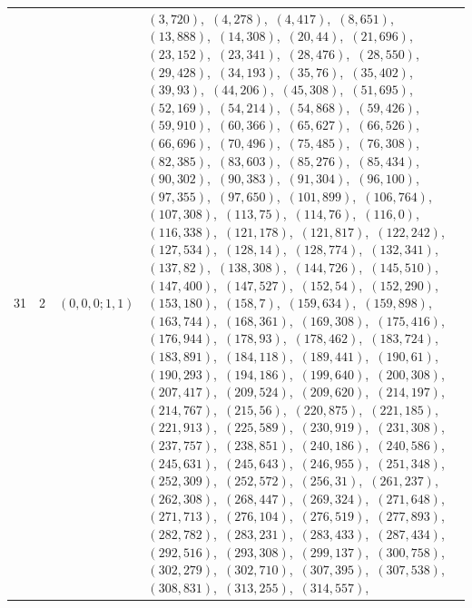 \documentclass[11pt]{article}
\begin{document}
\begin{longtable}{@{}rrl>{\raggedright\arraybackslash}p{}@{}}
31 & 2 & $(0,0,0;1,1)$ & $(3,720)$,\allowbreak\ $(4,278)$,\allowbreak\ $(4,417)$,\allowbreak\ $(8,651)$,\allowbreak\ $(13,888)$,\allowbreak\ $(14,308)$,\allowbreak\ $(20,44)$,\allowbreak\ $(21,696)$,\allowbreak\ $(23,152)$,\allowbreak\ $(23,341)$,\allowbreak\ $(28,476)$,\allowbreak\ $(28,550)$,\allowbreak\ $(29,428)$,\allowbreak\ $(34,193)$,\allowbreak\ $(35,76)$,\allowbreak\ $(35,402)$,\allowbreak\ $(39,93)$,\allowbreak\ $(44,206)$,\allowbreak\ $(45,308)$,\allowbreak\ $(51,695)$,\allowbreak\ $(52,169)$,\allowbreak\ $(54,214)$,\allowbreak\ $(54,868)$,\allowbreak\ $(59,426)$,\allowbreak\ $(59,910)$,\allowbreak\ $(60,366)$,\allowbreak\ $(65,627)$,\allowbreak\ $(66,526)$,\allowbreak\ $(66,696)$,\allowbreak\ $(70,496)$,\allowbreak\ $(75,485)$,\allowbreak\ $(76,308)$,\allowbreak\ $(82,385)$,\allowbreak\ $(83,603)$,\allowbreak\ $(85,276)$,\allowbreak\ $(85,434)$,\allowbreak\ $(90,302)$,\allowbreak\ $(90,383)$,\allowbreak\ $(91,304)$,\allowbreak\ $(96,100)$,\allowbreak\ $(97,355)$,\allowbreak\ $(97,650)$,\allowbreak\ $(101,899)$,\allowbreak\ $(106,764)$,\allowbreak\ $(107,308)$,\allowbreak\ $(113,75)$,\allowbreak\ $(114,76)$,\allowbreak\ $(116,0)$,\allowbreak\ $(116,338)$,\allowbreak\ $(121,178)$,\allowbreak\ $(121,817)$,\allowbreak\ $(122,242)$,\allowbreak\ $(127,534)$,\allowbreak\ $(128,14)$,\allowbreak\ $(128,774)$,\allowbreak\ $(132,341)$,\allowbreak\ $(137,82)$,\allowbreak\ $(138,308)$,\allowbreak\ $(144,726)$,\allowbreak\ $(145,510)$,\allowbreak\ $(147,400)$,\allowbreak\ $(147,527)$,\allowbreak\ $(152,54)$,\allowbreak\ $(152,290)$,\allowbreak\ $(153,180)$,\allowbreak\ $(158,7)$,\allowbreak\ $(159,634)$,\allowbreak\ $(159,898)$,\allowbreak\ $(163,744)$,\allowbreak\ $(168,361)$,\allowbreak\ $(169,308)$,\allowbreak\ $(175,416)$,\allowbreak\ $(176,944)$,\allowbreak\ $(178,93)$,\allowbreak\ $(178,462)$,\allowbreak\ $(183,724)$,\allowbreak\ $(183,891)$,\allowbreak\ $(184,118)$,\allowbreak\ $(189,441)$,\allowbreak\ $(190,61)$,\allowbreak\ $(190,293)$,\allowbreak\ $(194,186)$,\allowbreak\ $(199,640)$,\allowbreak\ $(200,308)$,\allowbreak\ $(207,417)$,\allowbreak\ $(209,524)$,\allowbreak\ $(209,620)$,\allowbreak\ $(214,197)$,\allowbreak\ $(214,767)$,\allowbreak\ $(215,56)$,\allowbreak\ $(220,875)$,\allowbreak\ $(221,185)$,\allowbreak\ $(221,913)$,\allowbreak\ $(225,589)$,\allowbreak\ $(230,919)$,\allowbreak\ $(231,308)$,\allowbreak\ $(237,757)$,\allowbreak\ $(238,851)$,\allowbreak\ $(240,186)$,\allowbreak\ $(240,586)$,\allowbreak\ $(245,631)$,\allowbreak\ $(245,643)$,\allowbreak\ $(246,955)$,\allowbreak\ $(251,348)$,\allowbreak\ $(252,309)$,\allowbreak\ $(252,572)$,\allowbreak\ $(256,31)$,\allowbreak\ $(261,237)$,\allowbreak\ $(262,308)$,\allowbreak\ $(268,447)$,\allowbreak\ $(269,324)$,\allowbreak\ $(271,648)$,\allowbreak\ $(271,713)$,\allowbreak\ $(276,104)$,\allowbreak\ $(276,519)$,\allowbreak\ $(277,893)$,\allowbreak\ $(282,782)$,\allowbreak\ $(283,231)$,\allowbreak\ $(283,433)$,\allowbreak\ $(287,434)$,\allowbreak\ $(292,516)$,\allowbreak\ $(293,308)$,\allowbreak\ $(299,137)$,\allowbreak\ $(300,758)$,\allowbreak\ $(302,279)$,\allowbreak\ $(302,710)$,\allowbreak\ $(307,395)$,\allowbreak\ $(307,538)$,\allowbreak\ $(308,831)$,\allowbreak\ $(313,255)$,\allowbreak\ $(314,557)$,\allowbreak\ 
\end{longtable}
\end{document}
